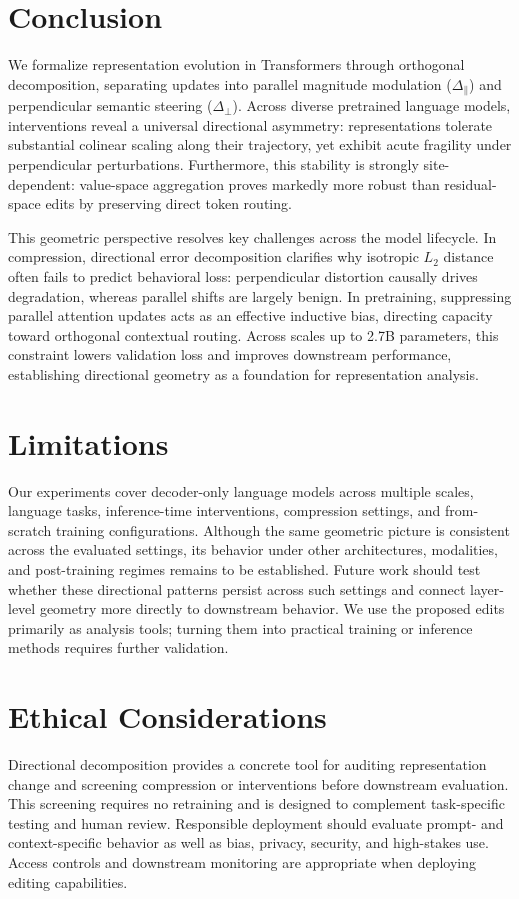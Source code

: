 \section{Conclusion}
\label{sec:conclusion}

We formalize representation evolution in Transformers through orthogonal decomposition, separating updates into parallel magnitude modulation ($\Delta_\parallel$) and perpendicular semantic steering ($\Delta_\perp$). Across diverse pretrained language models, interventions reveal a universal directional asymmetry: representations tolerate substantial colinear scaling along their trajectory, yet exhibit acute fragility under perpendicular perturbations. Furthermore, this stability is strongly site-dependent: value-space aggregation proves markedly more robust than residual-space edits by preserving direct token routing.

This geometric perspective resolves key challenges across the model lifecycle. In compression, directional error decomposition clarifies why isotropic $L_2$ distance often fails to predict behavioral loss: perpendicular distortion causally drives degradation, whereas parallel shifts are largely benign. In pretraining, suppressing parallel attention updates acts as an effective inductive bias, directing capacity toward orthogonal contextual routing. Across scales up to 2.7B parameters, this constraint lowers validation loss and improves downstream performance, establishing directional geometry as a foundation for representation analysis.

\section*{Limitations}
\label{sec:limitations}

Our experiments cover decoder-only language models across multiple scales,
language tasks, inference-time interventions, compression settings, and
from-scratch training configurations. Although the same geometric picture is
consistent across the evaluated settings, its behavior under other
architectures, modalities, and post-training regimes remains to be established.
Future work should test whether these directional patterns persist across such
settings and connect layer-level geometry more directly to downstream behavior.
We use the proposed edits primarily as analysis tools; turning them into
practical training or inference methods requires further validation.

\section*{Ethical Considerations}

Directional decomposition provides a concrete tool for auditing representation
change and screening compression or interventions before downstream evaluation.
This screening requires no retraining and is designed to complement
task-specific testing and human review. Responsible deployment should evaluate
prompt- and context-specific behavior as well as bias, privacy, security, and
high-stakes use. Access controls and downstream monitoring are appropriate when
deploying editing capabilities.
